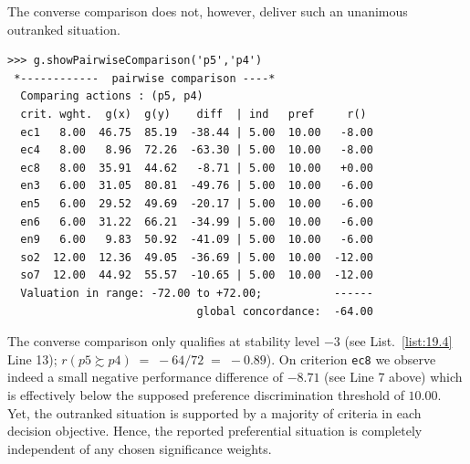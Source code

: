 The converse comparison does not, however, deliver such an unanimous outranked situation. 
\begin{lstlisting}
>>> g.showPairwiseComparison('p5','p4')
 *------------  pairwise comparison ----*
  Comparing actions : (p5, p4)
  crit. wght.  g(x)  g(y)    diff  | ind   pref     r()
  ec1   8.00  46.75  85.19  -38.44 | 5.00  10.00   -8.00
  ec4   8.00   8.96  72.26  -63.30 | 5.00  10.00   -8.00
  ec8   8.00  35.91  44.62   -8.71 | 5.00  10.00   +0.00
  en3   6.00  31.05  80.81  -49.76 | 5.00  10.00   -6.00
  en5   6.00  29.52  49.69  -20.17 | 5.00  10.00   -6.00
  en6   6.00  31.22  66.21  -34.99 | 5.00  10.00   -6.00
  en9   6.00   9.83  50.92  -41.09 | 5.00  10.00   -6.00
  so2  12.00  12.36  49.05  -36.69 | 5.00  10.00  -12.00
  so7  12.00  44.92  55.57  -10.65 | 5.00  10.00  -12.00
  Valuation in range: -72.00 to +72.00;           ------
                             global concordance:  -64.00
\end{lstlisting}
The converse comparison only qualifies at stability level $-3$ (see List.~\vref{list:19.4} Line 13); $r(p5 \succsim p4)\; =\; -64/72\; =\; -0.89$). On criterion \texttt{ec8} we observe indeed a small negative performance difference of $-8.71$ (see Line 7 above) which is effectively below the supposed preference discrimination threshold of $10.00$. Yet, the outranked situation is supported by a majority of criteria in each decision objective. Hence, the reported preferential situation is completely independent of any chosen significance weights.

